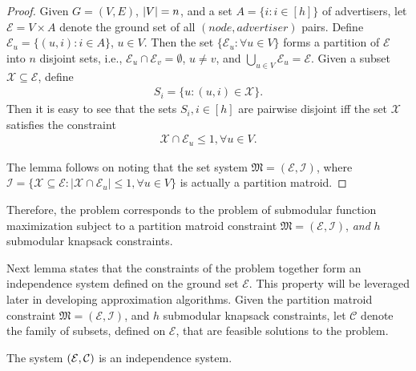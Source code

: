 \begin{proof}
Given $G=(V,E)$, $\left\vert{V}\right\vert = n$, and a set $A = \{i : i \in [h] \}$ of advertisers, let $\mathcal{E} = V \times A$ denote the ground set of all $(node, advertiser)$ pairs. Define $\mathcal{E}_u = \{ (u,i) : i \in A \}$, $u \in V$. Then the set $\{\mathcal{E}_u : \forall u \in  V \}$ forms a partition of $\mathcal{E}$ into $n$ disjoint sets, i.e., $\mathcal{E}_u \cap \mathcal{E}_v = \emptyset$, $u \ne v$, and $\bigcup_{u \in V} \mathcal{E}_u = \mathcal{E}$. Given a subset $\mathcal{X} \subseteq \mathcal{E}$, define
\begin{align*}
S_i = \{u : (u,i) \in \mathcal{X}\}.
\end{align*}
Then it is easy to see that the sets $S_i, i\in [h]$ are pairwise disjoint iff the set $\mathcal{X}$ satisfies the constraint
\begin{align*}
\mathcal{X} \cap \mathcal{E}_u \le 1, \forall u\in V.
\end{align*}

The lemma follows on noting that the set system $\mathfrak{M} = (\mathcal{E}, \mathcal{I})$, where $\mathcal{I} = \{\mathcal{X} \subseteq \mathcal{E} : |\mathcal{X}\cap\mathcal{E}_u| \le 1, \forall u \in V\}$ is actually a partition matroid.
\end{proof}

 Therefore, the \RM problem corresponds to the problem of submodular function maximization subject to a partition matroid constraint $\mathfrak{M} = (\mathcal{E}, \mathcal{I})$, \emph{and} $h$ submodular knapsack constraints.

Next lemma states that the constraints of the \RM problem together form an independence system defined on the ground set $\mathcal{E}$. This property will be leveraged later in developing approximation algorithms.
Given the partition matroid constraint $\mathfrak{M} = (\mathcal{E}, \mathcal{I})$, and $h$ submodular knapsack constraints, let $\mathcal{C}$ denote the family of subsets, defined on $\mathcal{E}$, that are feasible solutions to the \RM problem.

\begin{lemma}\label{lem:IS}
The system $(\mbox{$\mathcal{E}$}, \mbox{$\mathcal{C}$})$ is an independence system.
\end{lemma}

